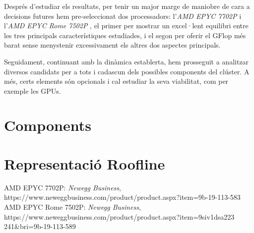 \documentclass{article}
\begin{document}
Després d'estudiar els resultats, per tenir un major marge de maniobre de cara a decisions futures hem pre-seleccionat dos processadors: l'\textit{AMD EPYC 7702P} \cite{AMDE7702P} i l'\textit{AMD EPYC Rome 7502P} \cite{AMDER7502P}, el primer per mostrar un excel·lent equilibri entre les tres principals característiques estudiades, i el segon per oferir el GFlop més barat sense menystenir excessivament els altres dos aspectes principals.

Seguidament, continuant amb la dinàmica establerta, hem prosseguit a analitzar diversos candidats per a tots i cadascun dels possibles components del clúster. A més, certs elements són opcionals i cal estudiar la seva viabilitat, com per exemple les GPUs.  %


\section{Components}

\section{Representació Roofline}

\begin{thebibliography}{}

 AMD EPYC 7702P: \textit{Newegg Business}, \\
https://www.neweggbusiness.com/product/product.aspx?item=9b-19-113-583
 AMD EPYC Rome 7502P: \textit{Newegg Business}, \\ https://www.neweggbusiness.com/product/product.aspx?item=9siv1dsa223\\241\&bri=9b-19-113-589

\end{thebibliography}
\end{document}
